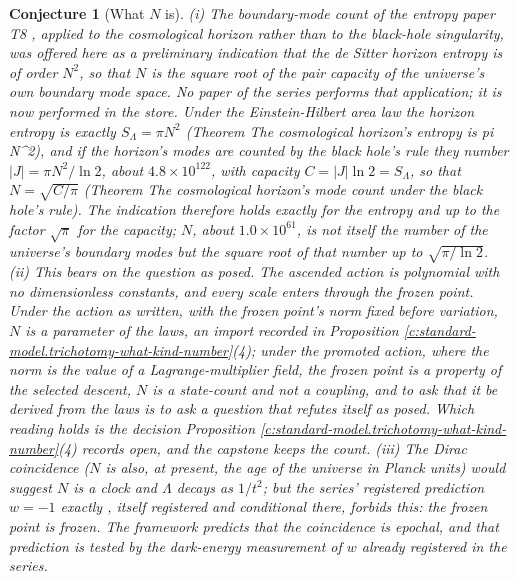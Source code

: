\documentclass[11pt]{article}
\newtheorem{conjecture}[theorem]{Conjecture}
\theoremstyle{definition}
\theoremstyle{plain}
\newcommand{\changedmark}[2]{\marginpar{\raggedright\scriptsize\color{#1}#2}}
\begin{document}
\begin{conjecture}[What $N$ is]\label{c:standard-model.what}
\changedmark{BurntOrange}{changed since the deposit}
(i) The boundary-mode count of the entropy paper T8 \cite[\S 3, Thm.~3.4]{ButlerT8}, applied to the cosmological horizon rather than to the black-hole singularity, was offered here as a preliminary indication that the de Sitter horizon entropy is of order $N^{2}$, so that $N$ is the square root of the pair capacity of the universe's own boundary mode space. No paper of the series performs that application; it is now performed in the store. Under the Einstein-Hilbert area law the horizon entropy is exactly $S_{\Lambda} = \pi N^{2}$ (Theorem \emph{The cosmological horizon's entropy is pi N\^{}2}), and if the horizon's modes are counted by the black hole's rule they number $|J| = \pi N^{2}/\ln 2$, about $4.8 \times 10^{122}$, with capacity $C = |J|\ln 2 = S_{\Lambda}$, so that $N = \sqrt{C/\pi}$ (Theorem \emph{The cosmological horizon's mode count under the black hole's rule}). The indication therefore holds exactly for the entropy and up to the factor $\sqrt{\pi}$ for the capacity; $N$, about $1.0 \times 10^{61}$, is not itself the number of the universe's boundary modes but the square root of that number up to $\sqrt{\pi/\ln 2}$. (ii) This bears on the question as posed. The ascended action is polynomial with no dimensionless constants, and every scale enters through the frozen point. Under the action as written, with the frozen point's norm fixed before variation, $N$ is a parameter of the laws, an import recorded in Proposition \ref{c:standard-model.trichotomy-what-kind-number}(4); under the promoted action, where the norm is the value of a Lagrange-multiplier field, the frozen point is a property of the selected descent, $N$ is a state-count and not a coupling, and to ask that it be derived from the laws is to ask a question that refutes itself as posed. Which reading holds is the decision Proposition \ref{c:standard-model.trichotomy-what-kind-number}(4) records open, and the capstone \cite[Table~1]{ButlerT17} keeps the count. (iii) The Dirac coincidence ($N$ is also, at present, the age of the universe in Planck units) would suggest $N$ is a clock and $\Lambda$ decays as $1/t^{2}$; but the series' registered prediction $w = -1$ exactly \cite[Prop.~4.2(iii)]{ButlerT10}, itself registered and conditional there, forbids this: the frozen point is frozen. The framework predicts that the coincidence is epochal, and that prediction is tested by the dark-energy measurement of $w$ already registered in the series.
\end{conjecture}
\end{document}
